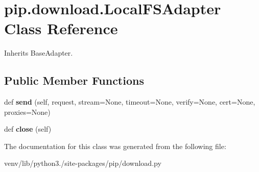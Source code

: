 \hypertarget{classpip_1_1download_1_1_local_f_s_adapter}{}\section{pip.\+download.\+Local\+F\+S\+Adapter Class Reference}
\label{classpip_1_1download_1_1_local_f_s_adapter}


Inherits Base\+Adapter.

\subsection*{Public Member Functions}
\begin{DoxyCompactItemize}
\item 
\mbox{\label{classpip_1_1download_1_1_local_f_s_adapter_ae659ad27e7e7c03f036cfb9b1eaeabfd}} 
def {\bfseries send} (self, request, stream=None, timeout=None, verify=None, cert=None, proxies=None)
\item 
\mbox{\label{classpip_1_1download_1_1_local_f_s_adapter_a9cb25cd9ba1f9b6caa3f90bf7f8733fa}} 
def {\bfseries close} (self)
\end{DoxyCompactItemize}


The documentation for this class was generated from the following file\+:\begin{DoxyCompactItemize}
\item 
venv/lib/python3./site-\/packages/pip/download.\+py\end{DoxyCompactItemize}
